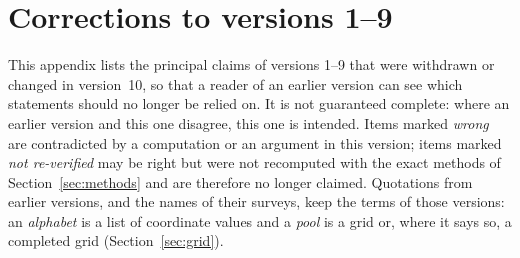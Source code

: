 \section{Corrections to versions 1--9}\label{sec:corrections}

This appendix lists the principal claims of versions 1--9 that were withdrawn or changed in
version~10, so that a reader of an earlier version can see which statements should no longer be
relied on.  It is not guaranteed
complete: where an earlier version and this one disagree, this one is intended.  Items marked \emph{wrong} are
contradicted by a computation or an argument in this version; items marked \emph{not
re-verified} may be right but were not recomputed with the exact methods of
Section~\ref{sec:methods} and are therefore no longer claimed.  Quotations from earlier
versions, and the names of their surveys, keep the terms of those versions: an \emph{alphabet}
is a list of coordinate values and a \emph{pool} is a grid or, where it says so, a completed
grid (Section~\ref{sec:grid}).

